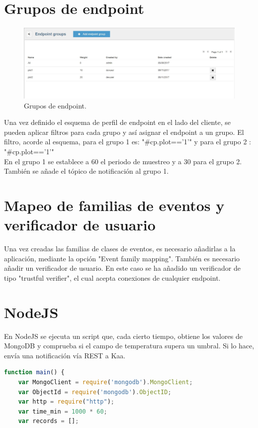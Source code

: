 \documentclass[12pt, twoside]{book}
\begin{document}
\begin{appendices}
\section{Grupos de endpoint}
\begin{figure}[H]
\centering
\includegraphics[scale=0.5]{images/endpoint_groups.jpg}
\caption{Grupos de endpoint.}\label{finalProject}
\end{figure}
Una vez definido el esquema de perfil de endpoint en el lado del cliente, se pueden aplicar filtros para cada grupo y así asignar el endpoint a un grupo. El filtro, acorde al esquema, para el grupo 1 es: "\#cp.plot=='1'" y para el grupo 2 :  "\#cp.plot=='1'" \\En el grupo 1 se establece a 60 el periodo de muestreo y a 30 para el grupo 2. También se añade el tópico de notificación al grupo 1.
\section{Mapeo de familias de eventos y verificador de usuario}
Una vez creadas las familias de clases de eventos, es necesario añadirlas a la aplicación, mediante la opción "Event family mapping". También es necesario añadir un verificador de usuario. En este caso se ha añadido un verificador de tipo "trustful verifier", el cual acepta conexiones de cualquier endpoint.
\section{NodeJS}
En NodeJS se ejecuta un script que, cada cierto tiempo, obtiene los valores de MongoDB y comprueba si el campo de temperatura supera un umbral. Si lo hace, envía una notificación vía REST a Kaa.
\lstset{
language=JavaScript,
extendedchars=true,
basicstyle=\footnotesize\ttfamily,
showstringspaces=false,
showspaces=false,
tabsize=2,
breaklines=true,
showtabs=false,
captionpos=b
}
\begin{lstlisting}[language=JavaScript]
function main() {
    var MongoClient = require('mongodb').MongoClient;
    var ObjectId = require('mongodb').ObjectID;
    var http = require("http");
    var time_min = 1000 * 60;
    var records = [];


\end{lstlisting}
\end{appendices}
\end{document}
